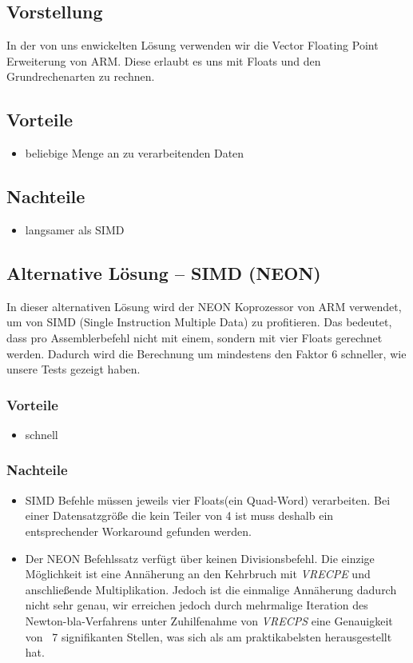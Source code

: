 \documentclass[11pt]{scrartcl}
\begin{document}
\subsection*{Vorstellung}
In der von uns enwickelten Lösung verwenden wir die Vector Floating Point Erweiterung von ARM. 
Diese erlaubt es uns mit Floats und den Grundrechenarten zu rechnen.
\subsection*{Vorteile}
\begin{itemize}
\item beliebige Menge an zu verarbeitenden Daten
\end{itemize}
\subsection*{Nachteile}
\begin{itemize}
\item langsamer als SIMD
\end{itemize}
\subsection{Alternative Lösung -- SIMD (NEON)}
In dieser alternativen Lösung wird der NEON Koprozessor von ARM verwendet, um von SIMD (Single Instruction Multiple Data)
zu profitieren. Das bedeutet, dass pro Assemblerbefehl nicht mit einem, sondern mit vier Floats gerechnet werden. Dadurch wird die Berechnung um mindestens den Faktor 6 schneller, wie unsere Tests gezeigt haben.
\subsubsection{Vorteile}
\begin{itemize}
\item schnell
\end{itemize}
\subsubsection{Nachteile}
\begin{itemize}
\item SIMD Befehle müssen jeweils vier Floats(ein Quad-Word) verarbeiten. Bei einer Datensatzgröße die kein Teiler von 4 ist muss deshalb ein entsprechender Workaround gefunden werden.
\item Der NEON Befehlssatz verfügt über keinen Divisionsbefehl. Die einzige Möglichkeit ist eine Annäherung an den Kehrbruch mit \emph{VRECPE} und anschließende Multiplikation. 
Jedoch ist die einmalige Annäherung dadurch nicht sehr genau, wir erreichen jedoch durch mehrmalige Iteration des Newton-bla-Verfahrens unter Zuhilfenahme von \emph{VRECPS} eine Genauigkeit von ~7 signifikanten Stellen, was sich als am praktikabelsten herausgestellt hat. 
\end{itemize}
\end{document}
